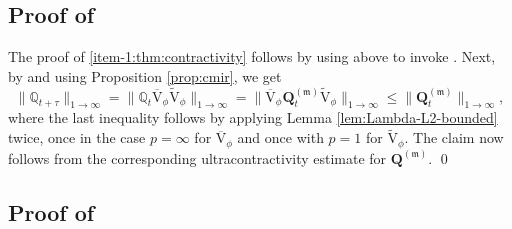 \documentclass[10pt]{amsart}
\theoremstyle{plain}
\theoremstyle{definition}
\newcommand{\J}{\mathds{Q}}
\newcommand{\m}{\mathfrak{m}}
\newcommand{\Q}[1][\mo]{\mathbf{Q}^{({#1})}}
\let\mo\mu
\begin{document}
\subsection{Proof of }

The proof of \eqref{item-1:thm:contractivity} follows by using  above to invoke \cite[Th.\,8]{Patie-Miclo}. Next, by  and using Proposition \ref{prop:cmir}, we get
\begin{equation*}
\|\J_{t+\tau}\|_{1\to\infty} = \|\J_t \overline{\mathrm{V}}_\phi \widetilde{\mathrm{V}}_\phi\|_{1\to\infty} = \|\overline{\mathrm{V}}_\phi \Q[\m]_t \widetilde{\mathrm{V}}_\phi\|_{1\to\infty} \leq \|\Q[\m]_t\|_{1\to\infty},
\end{equation*}
where the last inequality follows by applying Lemma \ref{lem:Lambda-L2-bounded} twice, once in the case \hbox{$p=\infty$} for $\overline{\mathrm{V}}_\phi$ and once with $p=1$ for $\widetilde{\mathrm{V}}_\phi$. The claim now follows from the corresponding ultracontractivity estimate for $\Q[\m]$. \qed

\subsection{Proof of }
\end{document}
